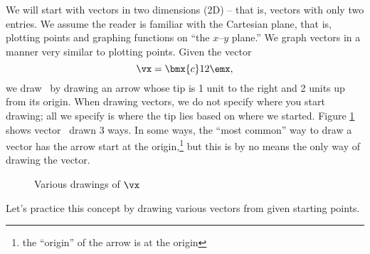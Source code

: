 We will start with vectors in two dimensions (2D) -- that is, vectors with only two entries. We assume the reader is familiar with the Cartesian plane, that is, plotting points and graphing functions on ``the $x$--$y$ plane.'' We graph vectors in a manner very similar to plotting points. Given the vector $$\vx = \bmx{c}1\\2\emx,$$ we draw \vx\ by drawing an arrow whose tip is 1 unit to the right and 2 units up from its origin. When drawing vectors, we do not specify where you start drawing; all we specify is where the tip lies based on where we started. Figure \ref{fig:draw_vectors} shows vector \vx\ drawn 3 ways. In some ways, the ``most common'' way to draw a vector has the arrow start at the origin,\footnote{the ``origin'' of the arrow is at the origin} but this is by no means the only way of drawing the vector.

\begin{figure}[h!]
\begin{center}
\end{center}
\caption{Various drawings of $\protect\vx$}
\label{fig:draw_vectors}
\end{figure}


Let's practice this concept by drawing various vectors from given starting points.\\

